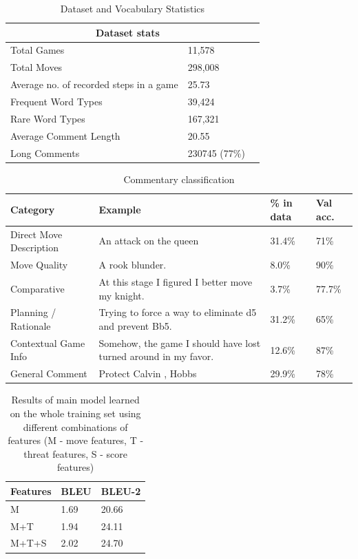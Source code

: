 \documentclass{article}
\begin{document}
\begin{table}
\centering
\begin{tabular}{ |p{3cm}|p{3cm}|p{3cm}|  }
\hline
\multicolumn{2}{|c|}{Dataset stats} \\
\hline
Total Games & 11,578 \\
Total Moves & 298,008 \\
Average no. of recorded steps in a game & 25.73 \\
\hline
Frequent Word Types    & 39,424 \\
Rare Word Types & 167,321 \\
\hline
Average Comment Length & 20.55   \\
Long Comments  & 230745 (77\%)\\
\hline
\end{tabular}
\caption{Dataset and Vocabulary Statistics}
\label{table:1}
\end{table}

\begin{table}
\centering
\begin{tabular}{|p{3cm}|p{3cm}|p{1cm}|p{1cm}|}
\hline
\textbf{Category} & \textbf{Example} & \textbf{\% in data} & \textbf{Val acc.} \\
\hline
Direct Move Description & An attack on the queen & 31.4\% & 71\% \\
\hline
Move Quality & A rook blunder. & 8.0\% & 90\% \\
\hline
Comparative & At this stage I figured I better move my knight. & 3.7\% & 77.7\% \\
\hline
Planning / Rationale & Trying to force a way to eliminate d5 and prevent Bb5. & 31.2\% & 65\% \\
\hline
Contextual Game Info & Somehow, the game I should have lost turned around in my favor. & 12.6\% & 87\% \\
\hline
General Comment & Protect Calvin , Hobbs & 29.9\% & 78\% \\
\hline
\end{tabular}
\caption{Commentary classification}
\label{table:2}
\end{table}

\begin{table}
\centering
\begin{tabular}{|p{3cm}|p{1cm}|p{1cm}|}
\hline
\textbf{Features} & \textbf{BLEU} & \textbf{BLEU-2} \\
\hline
M & 1.69 & 20.66 \\
M+T & 1.94 & 24.11 \\
M+T+S & 2.02 & 24.70 \\ 
\hline
\end{tabular}
\caption{Results of main model learned on the whole training set using different combinations of features (M - move features, T - threat features, S - score features)}
\label{table:3}
\end{table}
\end{document}
